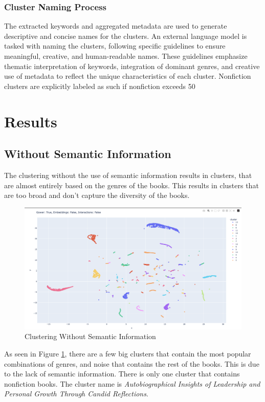 \documentclass[english]{mvi-report}
\begin{document}
\subsubsection{Cluster Naming Process}
The extracted keywords and aggregated metadata are used to generate descriptive and concise names for the clusters. An external language model is tasked with naming the clusters, following specific guidelines to ensure meaningful, creative, and human-readable names. These guidelines emphasize thematic interpretation of keywords, integration of dominant genres, and creative use of metadata to reflect the unique characteristics of each cluster. Nonfiction clusters are explicitly labeled as such if nonfiction exceeds 50%



\section{Results}
\subsection{Without Semantic Information}
The clustering without the use of semantic information results in clusters, that are almost entirely based on the genres of the books. This results in clusters that are too broad and don't capture the diversity of the books.

\begin{figure}[H]
    \centering
    \includegraphics[width=\linewidth]{img/gower.png}
    \caption{Clustering Without Semantic Information}
    \label{fig:without_semantic}
\end{figure}

As seen in Figure \ref{fig:without_semantic}, there are a few big clusters that contain the most popular combinations of genres, and noise that contains the rest of the books. This is due to the lack of semantic information.
There is only one cluster that contains nonfiction books. The cluster name is \textit{Autobiographical Insights of Leadership and Personal Growth Through Candid Reflections}.
\end{document}

